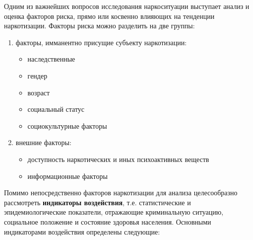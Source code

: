 \documentclass[a4paper,14pt]{article}
\begin{document}
Одним из важнейших вопросов исследования наркоситуации выступает анализ и
оценка факторов риска, прямо или косвенно влияющих на тенденции наркотизации. Факторы риска можно разделить на две группы:
\begin{enumerate}
	\item факторы, имманентно присущие субъекту наркотизации:
	\begin{itemize}
		\item наследственные
		\item гендер
		\item возраст
		\item социальный статус
		\item социокультурные факторы
	\end{itemize}
	\item внешние факторы:
	\begin{itemize}
	\item доступность наркотических и иных психоактивных веществ
	\item информационные факторы	
	\end{itemize}
	
\end{enumerate}	
	Помимо непосредственно факторов наркотизации для анализа целесообразно рассмотреть \textbf{индикаторы воздействия}, т.е. статистические
	и эпидемиологические показатели, отражающие криминальную ситуацию, социальное
	положение и состояние здоровья населения.
	Основными индикаторами воздействия определены следующие:
\end{document}
